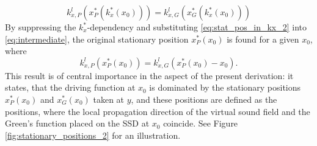 \documentclass[12pt,a4paper]{article}
\begin{document}
%
\begin{equation} 
k^l_{x,P}(x^*_P(k^*_x(x_0))) = k^l_{x,G}(x^*_G(k^*_x(x_0)))
\label{eq:intermediate}
\end{equation}
By suppressing the $k^*_x$-dependency and substituting \eqref{eq:stat_pos_in_kx_2} into \eqref{eq:intermediate}, the original stationary position $x^*_P(x_0)$ is found for a given $x_0$, where 
\begin{equation}
k^l_{x,P}(x^*_P(x_0)) = k^l_{x,G}(x^*_P(x_0) - x_0).
\label{eq:sdm_Stat_point}
\end{equation}
This result is of central importance in the aspect of the present derivation: it states, that the driving function at $x_0$ is dominated by the stationary positions $x^*_P(x_0)$ and $x^*_G(x_0)$ taken at $y$, and these positions are defined as the positions, where the local propagation direction of the virtual sound field and the Green's function placed on the SSD at $x_0$ coincide.
See Figure \ref{fig:stationary_positions_2} for an illustration.
\end{document}
